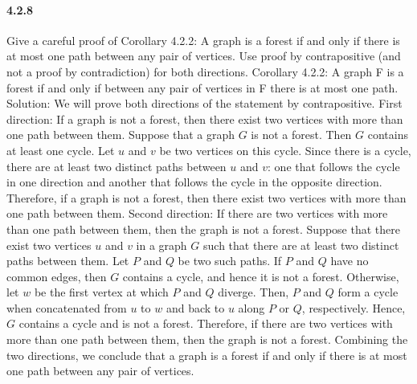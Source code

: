 \documentclass{article}
\begin{document}
 \paragraph{4.2.8}
 Give a careful proof of Corollary 4.2.2: A graph is a forest if and only if there is at most one path between any pair of vertices. Use proof by contrapositive (and not a proof by contradiction) for both directions.\newline
 Corollary 4.2.2: A graph F is a forest if and only if between any pair of vertices
in F there is at most one path.\newline
Solution:\newline
We will prove both directions of the statement by contrapositive.
\newline
First direction: If a graph is not a forest, then there exist two vertices with more than one path between them.
\newline
Suppose that a graph $G$ is not a forest. Then $G$ contains at least one cycle. Let $u$ and $v$ be two vertices on this cycle. Since there is a cycle, there are at least two distinct paths between $u$ and $v$: one that follows the cycle in one direction and another that follows the cycle in the opposite direction. Therefore, if a graph is not a forest, then there exist two vertices with more than one path between them.
\newline
Second direction: If there are two vertices with more than one path between them, then the graph is not a forest.
\newline
Suppose that there exist two vertices $u$ and $v$ in a graph $G$ such that there are at least two distinct paths between them. Let $P$ and $Q$ be two such paths. If $P$ and $Q$ have no common edges, then $G$ contains a cycle, and hence it is not a forest. Otherwise, let $w$ be the first vertex at which $P$ and $Q$ diverge. Then, $P$ and $Q$ form a cycle when concatenated from $u$ to $w$ and back to $u$ along $P$ or $Q$, respectively. Hence, $G$ contains a cycle and is not a forest. Therefore, if there are two vertices with more than one path between them, then the graph is not a forest.
\newline
Combining the two directions, we conclude that a graph is a forest if and only if there is at most one path between any pair of vertices.
\end{document}
